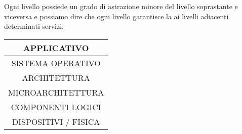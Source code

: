Ogni livello possiede un grado di astrazione minore del livello soprastante e viceversa e possiamo
dire che ogni livello garantisce la ai livelli adiacenti determinati servizi.

\begin{center}
	\begin{tabular}{|c|}
		\hline
		APPLICATIVO          \\ \hline
		SISTEMA OPERATIVO    \\ \hline
		ARCHITETTURA         \\ \hline
		MICROARCHITETTURA    \\ \hline
		COMPONENTI LOGICI    \\ \hline
		DISPOSITIVI / FISICA \\ \hline
	\end{tabular}
\end{center}

